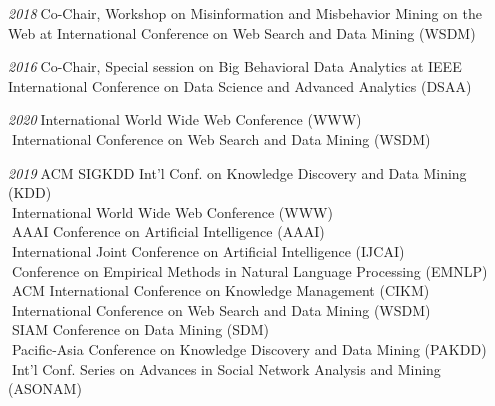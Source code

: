 \documentclass[10pt]{article}
\newenvironment{myindentpar}[1]%
{\begin{list}{}%
         {\setlength{\leftmargin}{#1}}%
         \item[]%
}
{\end{list}}
\newcounter{list}
\begin{document}
\begin{myindentpar}{0.75cm}
{\hspace{-0.75cm}\emph{2018}\textcolor{white}{.}Co-Chair, Workshop on Misinformation and Misbehavior Mining on the Web at International Conference on Web Search and Data Mining (WSDM)

\hspace{-0.75cm}\emph{2016}\textcolor{white}{.}Co-Chair, Special session on Big Behavioral Data Analytics at IEEE International Conference on Data Science and Advanced Analytics (DSAA)

}


\hspace{-0.75cm}{\bf Program Committee}

{\small

\hspace{-0.75cm}\emph{2020}\textcolor{white}{.}International World Wide Web Conference (WWW) \\
\textcolor{white}{.}International Conference on Web Search and Data Mining (WSDM)

\hspace{-0.75cm}\emph{2019}\textcolor{white}{.}ACM SIGKDD Int'l Conf. on Knowledge Discovery and Data Mining (KDD) \\
\textcolor{white}{.}International World Wide Web Conference (WWW) \\
\textcolor{white}{.}AAAI Conference on Artificial Intelligence (AAAI) \\
\textcolor{white}{.}International Joint Conference on Artificial Intelligence (IJCAI) \\
\textcolor{white}{.}Conference on Empirical Methods in Natural Language Processing (EMNLP) \\
\textcolor{white}{.}ACM International Conference on Knowledge Management (CIKM) \\
\textcolor{white}{.}International Conference on Web Search and Data Mining (WSDM) \\
\textcolor{white}{.}SIAM Conference on Data Mining (SDM) \\
\textcolor{white}{.}Pacific-Asia Conference on Knowledge Discovery and Data Mining (PAKDD) \\
\textcolor{white}{.}Int'l Conf. Series on Advances in Social Network Analysis and Mining (ASONAM)
	
}
\end{myindentpar}
\end{document}
